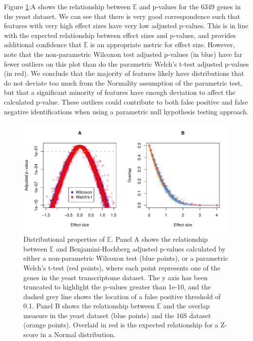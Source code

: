 \documentclass[fleqn,10pt,lineno]{wlpeerj}
\begin{document}
Figure \ref{fig:null}:A shows the relationship between $\mathbb{E}$ and p-values for the 6349 genes in the yeast dataset. We can see that there is very good correspondence such that features with very high effect sizes have very low adjusted p-values. This is in line with the expected relationship between effect sizes and p-values, and provides additional confidence that $\mathbb{E}$ is an appropriate metric for effect size. However, note that the non-parametric Wilcoxon test adjusted p-values (in blue) have far fewer outliers on this plot than do the parametric Welch's t-test adjusted p-values (in red). We conclude that the majority of features likely have distributions that do not deviate too much from the Normality assumption of the parametric test, but that  a significant minority of features have enough deviation to affect the calculated p-value. These outliers could contribute to both false positive and false negative identifications when using a parametric null hypothesis testing approach.

\begin{figure}[tpb]
\centerline{\includegraphics[scale=0.5]{null-effect.pdf}}
\caption{Distributional properties of $\mathbb{E}$. Panel A shows the relationship between  $\mathbb{E}$ and Benjamini-Hochberg adjusted p-values calculated by either a non-parametric Wilcoxon test (blue points), or a parametric Welch's t-test  (red points), where each point represents one of the genes in the yeast transcriptome dataset. The y axis has been truncated to highlight the p-values greater than 1e-10, and the dashed grey line shows the location of a false positive threshold of 0.1. Panel B shows the relationship between  $\mathbb{E}$ and the overlap measure in the yeast dataset (blue points) and the 16S dataset (orange points). Overlaid in red is the expected relationship for a Z-score in a Normal distribution. }
\label{fig:null}
\end{figure}
\end{document}
